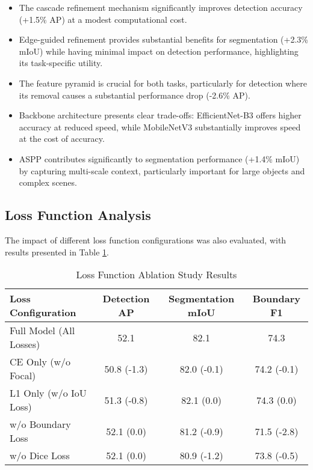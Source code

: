 \begin{itemize}
    \item The cascade refinement mechanism significantly improves detection accuracy (+1.5\% AP) at a modest computational cost.
    
    \item Edge-guided refinement provides substantial benefits for segmentation (+2.3\% mIoU) while having minimal impact on detection performance, highlighting its task-specific utility.
    
    \item The feature pyramid is crucial for both tasks, particularly for detection where its removal causes a substantial performance drop (-2.6\% AP).
    
    \item Backbone architecture presents clear trade-offs: EfficientNet-B3 offers higher accuracy at reduced speed, while MobileNetV3 substantially improves speed at the cost of accuracy.
    
    \item ASPP contributes significantly to segmentation performance (+1.4\% mIoU) by capturing multi-scale context, particularly important for large objects and complex scenes.
\end{itemize}

\subsection{Loss Function Analysis}
The impact of different loss function configurations was also evaluated, with results presented in Table \ref{tab:loss_ablation}.

\begin{table}[h]
\centering
\caption{Loss Function Ablation Study Results}
\label{tab:loss_ablation}
\begin{tabular}{lccc}
\hline
\textbf{Loss Configuration} & \textbf{Detection AP} & \textbf{Segmentation mIoU} & \textbf{Boundary F1} \\
\hline
Full Model (All Losses) & 52.1 & 82.1 & 74.3 \\
\hline
CE Only (w/o Focal) & 50.8 (-1.3) & 82.0 (-0.1) & 74.2 (-0.1) \\
L1 Only (w/o IoU Loss) & 51.3 (-0.8) & 82.1 (0.0) & 74.3 (0.0) \\
w/o Boundary Loss & 52.1 (0.0) & 81.2 (-0.9) & 71.5 (-2.8) \\
w/o Dice Loss & 52.1 (0.0) & 80.9 (-1.2) & 73.8 (-0.5) \\
\hline
\end{tabular}
\end{table}

